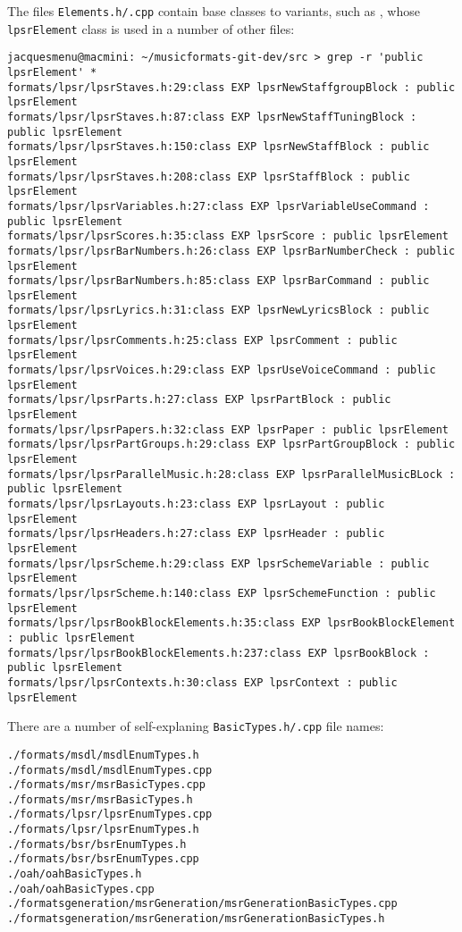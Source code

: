 The files {\tt *Elements.h/.cpp} contain base classes to variants, such as , whose {\tt lpsrElement} class   is used in a number of other files:
\begin{lstlisting}[language=Terminal]
jacquesmenu@macmini: ~/musicformats-git-dev/src > grep -r 'public lpsrElement' *
formats/lpsr/lpsrStaves.h:29:class EXP lpsrNewStaffgroupBlock : public lpsrElement
formats/lpsr/lpsrStaves.h:87:class EXP lpsrNewStaffTuningBlock : public lpsrElement
formats/lpsr/lpsrStaves.h:150:class EXP lpsrNewStaffBlock : public lpsrElement
formats/lpsr/lpsrStaves.h:208:class EXP lpsrStaffBlock : public lpsrElement
formats/lpsr/lpsrVariables.h:27:class EXP lpsrVariableUseCommand : public lpsrElement
formats/lpsr/lpsrScores.h:35:class EXP lpsrScore : public lpsrElement
formats/lpsr/lpsrBarNumbers.h:26:class EXP lpsrBarNumberCheck : public lpsrElement
formats/lpsr/lpsrBarNumbers.h:85:class EXP lpsrBarCommand : public lpsrElement
formats/lpsr/lpsrLyrics.h:31:class EXP lpsrNewLyricsBlock : public lpsrElement
formats/lpsr/lpsrComments.h:25:class EXP lpsrComment : public lpsrElement
formats/lpsr/lpsrVoices.h:29:class EXP lpsrUseVoiceCommand : public lpsrElement
formats/lpsr/lpsrParts.h:27:class EXP lpsrPartBlock : public lpsrElement
formats/lpsr/lpsrPapers.h:32:class EXP lpsrPaper : public lpsrElement
formats/lpsr/lpsrPartGroups.h:29:class EXP lpsrPartGroupBlock : public lpsrElement
formats/lpsr/lpsrParallelMusic.h:28:class EXP lpsrParallelMusicBLock : public lpsrElement
formats/lpsr/lpsrLayouts.h:23:class EXP lpsrLayout : public lpsrElement
formats/lpsr/lpsrHeaders.h:27:class EXP lpsrHeader : public lpsrElement
formats/lpsr/lpsrScheme.h:29:class EXP lpsrSchemeVariable : public lpsrElement
formats/lpsr/lpsrScheme.h:140:class EXP lpsrSchemeFunction : public lpsrElement
formats/lpsr/lpsrBookBlockElements.h:35:class EXP lpsrBookBlockElement : public lpsrElement
formats/lpsr/lpsrBookBlockElements.h:237:class EXP lpsrBookBlock : public lpsrElement
formats/lpsr/lpsrContexts.h:30:class EXP lpsrContext : public lpsrElement
\end{lstlisting}

\newpage

There are a number of self-explaning {\tt *BasicTypes.h/.cpp} file names:%
\begin{lstlisting}[language=Terminal]
./formats/msdl/msdlEnumTypes.h
./formats/msdl/msdlEnumTypes.cpp
./formats/msr/msrBasicTypes.cpp
./formats/msr/msrBasicTypes.h
./formats/lpsr/lpsrEnumTypes.cpp
./formats/lpsr/lpsrEnumTypes.h
./formats/bsr/bsrEnumTypes.h
./formats/bsr/bsrEnumTypes.cpp
./oah/oahBasicTypes.h
./oah/oahBasicTypes.cpp
./formatsgeneration/msrGeneration/msrGenerationBasicTypes.cpp
./formatsgeneration/msrGeneration/msrGenerationBasicTypes.h
\end{lstlisting}

